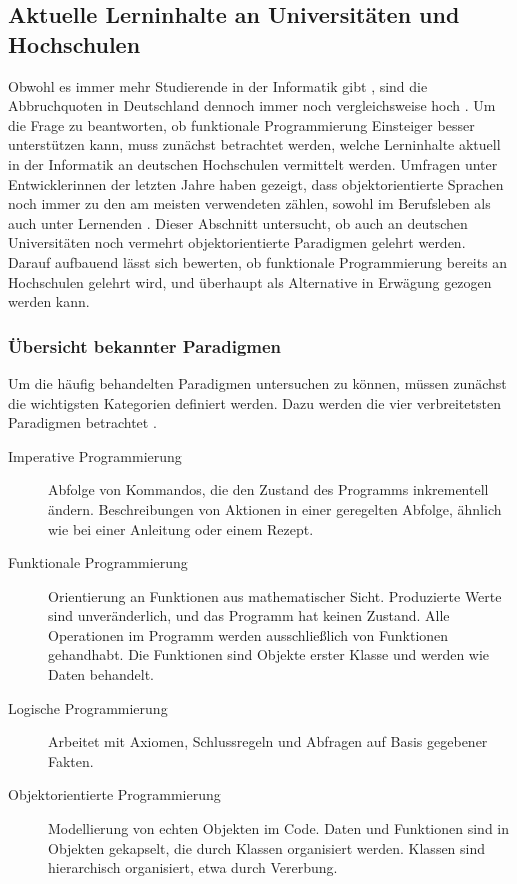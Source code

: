 \subsection{Aktuelle Lerninhalte an Universitäten und Hochschulen}
Obwohl es immer mehr Studierende in der Informatik gibt \cite{destatis}, sind die Abbruchquoten in Deutschland dennoch immer noch vergleichsweise hoch \cite{dhzw}. Um die Frage zu beantworten, ob funktionale Programmierung Einsteiger besser unterstützen kann, muss zunächst betrachtet werden, welche Lerninhalte aktuell in der Informatik an deutschen Hochschulen vermittelt werden.
Umfragen unter Entwicklerinnen der letzten Jahre haben gezeigt, dass objektorientierte Sprachen noch immer zu den am meisten verwendeten zählen, sowohl im Berufsleben als auch unter Lernenden \cite{stackoverflow}. Dieser Abschnitt untersucht, ob auch an deutschen Universitäten noch vermehrt objektorientierte Paradigmen gelehrt werden.
Darauf aufbauend lässt sich bewerten, ob funktionale Programmierung bereits an Hochschulen gelehrt wird, und überhaupt als Alternative in Erwägung gezogen werden kann.

\subsubsection{Übersicht bekannter Paradigmen}
Um die häufig behandelten Paradigmen untersuchen zu können, müssen zunächst die wichtigsten Kategorien definiert werden. Dazu werden die vier verbreitetsten Paradigmen betrachtet \cite{normark}.

\begin{description}
    \item[Imperative Programmierung] Abfolge von Kommandos, die den Zustand des Programms inkrementell ändern. Beschreibungen von Aktionen in einer geregelten Abfolge, ähnlich wie bei einer Anleitung oder einem Rezept.
    \item[Funktionale Programmierung] Orientierung an Funktionen aus mathematischer Sicht. Produzierte Werte sind unveränderlich, und das Programm hat keinen Zustand. Alle Operationen im Programm werden ausschließlich von Funktionen gehandhabt. Die Funktionen sind Objekte erster Klasse und werden wie Daten behandelt.
    \item[Logische Programmierung] Arbeitet mit Axiomen, Schlussregeln und Abfragen auf Basis gegebener Fakten.
    \item[Objektorientierte Programmierung] Modellierung von echten Objekten im Code. Daten und Funktionen sind in Objekten gekapselt, die durch Klassen organisiert werden. Klassen sind hierarchisch organisiert, etwa durch Vererbung.
\end{description}

